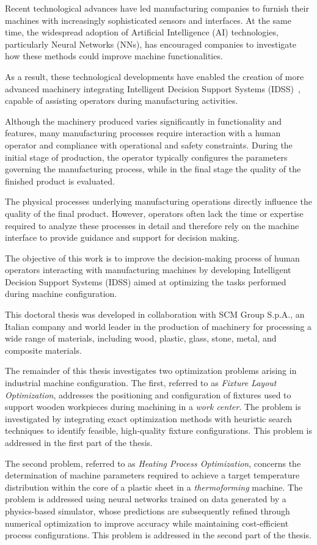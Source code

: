 \label{chap:introduction}

Recent technological advances have led manufacturing companies to furnish their machines with increasingly sophisticated sensors and interfaces. At the same time, the widespread adoption of Artificial Intelligence (AI) technologies, particularly Neural Networks (NNs), has encouraged companies to investigate how these methods could improve machine functionalities.

As a result, these technological developments have enabled the creation of more advanced machinery integrating Intelligent Decision Support Systems (IDSS)~\cite{phillips2013intelligent}, capable of assisting operators during manufacturing activities.

Although the machinery produced varies significantly in functionality and features, many manufacturing processes require interaction with a human operator and compliance with operational and safety constraints. During the initial stage of production, the operator typically configures the parameters governing the manufacturing process, while in the final stage the quality of the finished product is evaluated.

The physical processes underlying manufacturing operations directly influence the quality of the final product. However, operators often lack the time or expertise required to analyze these processes in detail and therefore rely on the machine interface to provide guidance and support for decision making.

The objective of this work is to improve the decision-making process of human operators interacting with manufacturing machines by developing Intelligent Decision Support Systems (IDSS) aimed at optimizing the tasks performed during machine configuration.

This doctoral thesis was developed in collaboration with SCM Group S.p.A., an Italian company and world leader in the production of machinery for processing a wide range of materials, including wood, plastic, glass, stone, metal, and composite materials.

The remainder of this thesis investigates two optimization problems arising in industrial machine configuration. The first, referred to as \textit{Fixture Layout Optimization}, addresses the positioning and configuration of fixtures used to support wooden workpieces during machining in a \textit{work center}. The problem is investigated by integrating exact optimization methods with heuristic search techniques to identify feasible, high-quality fixture configurations. This problem is addressed in the first part of the thesis.

The second problem, referred to as \textit{Heating Process Optimization}, concerns the determination of machine parameters required to achieve a target temperature distribution within the core of a plastic sheet in a \textit{thermoforming} machine. The problem is addressed using neural networks trained on data generated by a physics-based simulator, whose predictions are subsequently refined through numerical optimization to improve accuracy while maintaining cost-efficient process configurations. This problem is addressed in the second part of the thesis.

